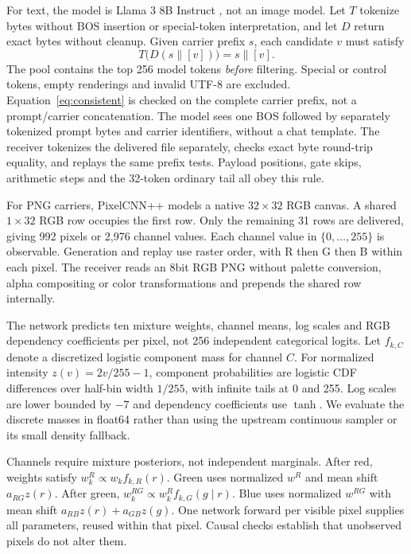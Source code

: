 \documentclass[a4paper,twoside]{article}
\begin{document}
For text, the model is Llama 3 8B Instruct \cite{llama3}, not an image model. Let $T$ tokenize bytes without BOS insertion or special-token interpretation, and let $D$ return exact bytes without cleanup. Given carrier prefix $s$, each candidate $v$ must satisfy
\begin{equation}
T\bigl(D(s\mathbin{\|}[v])\bigr)=s\mathbin{\|}[v].
\label{eq:consistent}
\end{equation}
The pool contains the top 256 model tokens \emph{before} filtering. Special or control tokens, empty renderings and invalid UTF-8 are excluded. Equation~\ref{eq:consistent} is checked on the complete carrier prefix, not a prompt/carrier concatenation. The model sees one BOS followed by separately tokenized prompt bytes and carrier identifiers, without a chat template. The receiver tokenizes the delivered file separately, checks exact byte round-trip equality, and replays the same prefix tests. Payload positions, gate skips, arithmetic steps and the 32-token ordinary tail all obey this rule.

For PNG carriers, PixelCNN++ \cite{pixelcnn} models a native $32\times32$ RGB canvas. A shared $1\times32$ RGB row occupies the first row. Only the remaining 31 rows are delivered, giving 992 pixels or 2,976 channel values. Each channel value in $\{0,\ldots,255\}$ is observable. Generation and replay use raster order, with R then G then B within each pixel. The receiver reads an 8bit RGB PNG without palette conversion, alpha compositing or color transformations and prepends the shared row internally.

The network predicts ten mixture weights, channel means, log scales and RGB dependency coefficients per pixel, not 256 independent categorical logits. Let $f_{k,C}$ denote a discretized logistic component mass for channel $C$. For normalized intensity $z(v)=2v/255-1$, component probabilities are logistic CDF differences over half-bin width $1/255$, with infinite tails at 0 and 255. Log scales are lower bounded by $-7$ and dependency coefficients use $\tanh$. We evaluate the discrete masses in float64 rather than using the upstream continuous sampler or its small density fallback.

Channels require mixture posteriors, not independent marginals. After red, weights satisfy $w_k^R\propto w_k f_{k,R}(r)$. Green uses normalized $w^R$ and mean shift $a_{RG}z(r)$. After green, $w_k^{RG}\propto w_k^R f_{k,G}(g\mid r)$. Blue uses normalized $w^{RG}$ with mean shift $a_{RB}z(r)+a_{GB}z(g)$. One network forward per visible pixel supplies all parameters, reused within that pixel. Causal checks establish that unobserved pixels do not alter them.
\end{document}
